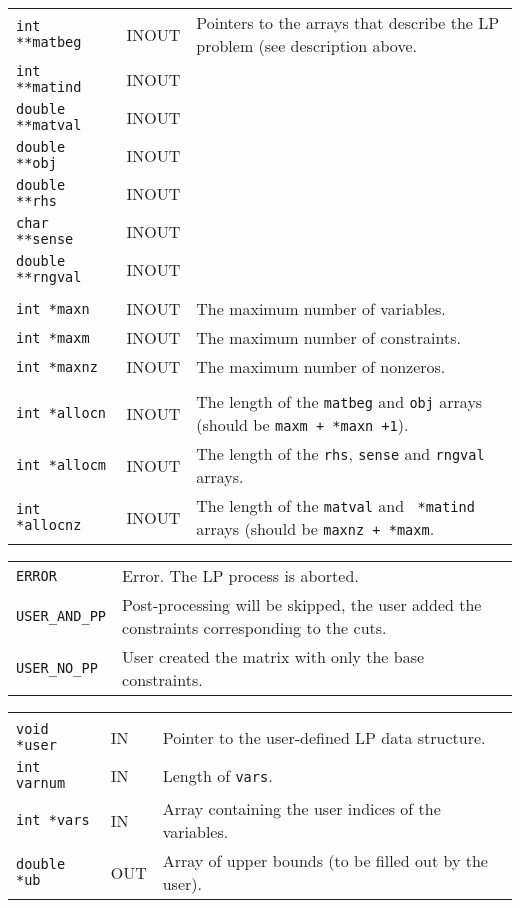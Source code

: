 \documentclass[twoside,11pt]{article}
\begin{document}
{\begin{tabular}{llp{291.115pt}}
{\tt int **matbeg} & INOUT & Pointers to the arrays that describe the LP
problem (see description above. \\ 
{\tt int **matind} & INOUT & \\ 
{\tt double **matval} & INOUT & \\ 
{\tt double **obj} & INOUT & \\ 
{\tt double **rhs} & INOUT & \\ 
{\tt char **sense} & INOUT & \\ 
{\tt double **rngval} & INOUT & \\ 
& & \\ 
{\tt int *maxn} & INOUT & The maximum number of variables.\\ 
{\tt int *maxm} & INOUT & The maximum number of constraints.\\ 
{\tt int *maxnz} & INOUT & The maximum number of nonzeros. \\ 
& & \\ 
{\tt int *allocn} & INOUT & The length of the {\tt *matbeg} and {\tt *obj}
arrays (should be {\tt *maxm + *maxn +1}). \\ 
{\tt int *allocm} & INOUT & The length of the {\tt *rhs}, {\tt *sense}
and {\tt *rngval} arrays. \\ 
{\tt int *allocnz} & INOUT & The length of the {\tt *matval} and {\tt
*matind} arrays (should be {\tt *maxnz + *maxm}. \\ 
\end{tabular}
}

{\newpage
\clearpage
\samepage \begin{tabular}{lp{365.945pt}}
{\tt ERROR} & Error. The LP process is aborted. \\ 
{\tt USER\_AND\_PP} & Post-processing will be skipped, the user added the
constraints corresponding to the cuts. \\ 
{\tt USER\_NO\_PP} & User created the matrix with only the base constraints. \\ 
\end{tabular}
}

{\newpage
\clearpage
\samepage \begin{tabular}{llp{317.395pt}}
& & \\ 
{\tt void *user} & IN & Pointer to the user-defined LP data structure. \\ 

{\tt int varnum} & IN & Length of {\tt vars}. \\ 
{\tt int *vars} & IN & Array containing the user indices of the variables. \\ 
{\tt double *ub} & OUT & Array of upper bounds (to be filled out by
the user).
\\ 
\end{tabular}
}
\end{document}
